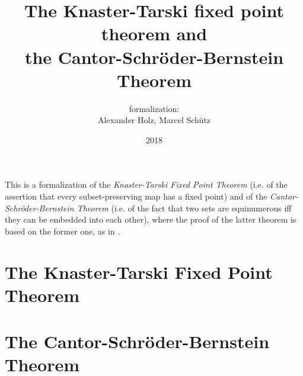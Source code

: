 \documentclass{article}
\title{The Knaster-Tarski fixed point theorem and \\
the Cantor-Schröder-Bernstein Theorem}
\author{\Naproche formalization:\\[0.5em]Alexander Holz, Marcel Schütz}
\date{2018}
\begin{document}
  \maketitle


  \noindent This is a formalization of the \textit{Knaster-Tarski Fixed Point
  Theorem} (i.e. of the assertion that every subset-preserving map has a fixed
  point) and of the \textit{Cantor-Schröder-Bernstein Theorem} (i.e. of the
  fact that two sets are equinumerous iff they can be embedded into each other),
  where the proof of the latter theorem is based on the former one, as in
  \cite{Schroeder2012}.

  \section*{The Knaster-Tarski Fixed Point Theorem}

  \section*{The Cantor-Schröder-Bernstein Theorem}

  \printbibliography
\end{document}
